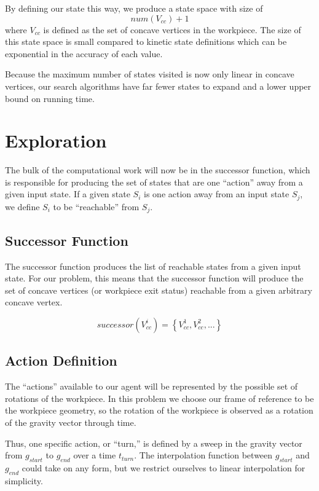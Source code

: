 By defining our state this way, we produce a state space with size of
$$
num(V_{cc}) + 1
$$
where $V_{cc}$ is defined as the set of concave vertices in the workpiece. The size of this state space is small compared to kinetic state definitions which can be exponential in the accuracy of each value.

Because the maximum number of states visited is now only linear in concave vertices, our search algorithms have far fewer states to expand and a lower upper bound on running time.

\section{Exploration}

The bulk of the computational work will now be in the successor function, which is responsible for producing the set of states that are one ``action'' away from a given input state. If a given state $S_i$ is one action away from an input state $S_j$, we define $S_i$ to be ``reachable'' from $S_j$.

	\subsection{Successor Function}

The successor function produces the list of reachable states from a given input state. For our problem, this means that the successor function will produce the set of concave vertices (or workpiece exit status) reachable from a given arbitrary concave vertex.

$$
successor(V_{cc}^{i}) = \left \{ V_{cc}^{1}, V_{cc}^{2}, ...  \right \}
$$

	\subsection{Action Definition}

The ``actions'' available to our agent will be represented by the possible set of rotations of the workpiece. In this problem we choose our frame of reference to be the workpiece geometry, so the rotation of the workpiece is observed as a rotation of the gravity vector through time.

Thus, one specific action, or ``turn,'' is defined by a sweep in the gravity vector from $g_{start}$ to $g_{end}$ over a time $t_{turn}$. The interpolation function between $g_{start}$ and $g_{end}$ could take on any form, but we restrict ourselves to linear interpolation for simplicity.

